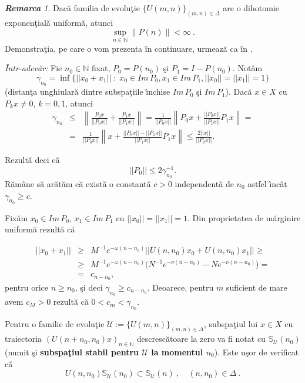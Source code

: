 \documentclass[ a4paper, 12pt]{report}
\newcommand{\N}{\mathbb{N}}
\newcommand{\defnemph}[1]{\textbf{#1}}
\theoremstyle{definition}
\theoremstyle{remark}
\newtheorem{remarc}{\bf Remarca}[section]
\numberwithin{equation}{section}
\begin{document}
\begin{remarc}
\label{boundedprojectors}
Dac\u a familia de evolu\c tie $\{U(m,n)\}_{(m,n)\in\Delta}$ are o {dihotomie exponen\c tial\u a uniform\u a}, atunci
$$\sup_{n\in\N}\|P(n)\| <\infty\ .$$
Demonstra\c tia, pe care o vom prezenta \^in continuare, urmeaz\u a ca \^in \cite[Lema~4.2]{MinhRabigerSchnaubelt}.

{\it \^ Intr-adev\u ar:} Fie $n_0 \in \mathbb{N}$ fixat, $P_0 = P(n_0)$ \c si $P_1 = I - P(n_0)$. Not\u am
$$\gamma_{n_0} = \inf \{ ||x_0 + x_1|| \; : \; x_0 \in Im\, P_0, x_1 \in Im\, P_1, ||x_0|| = ||x_1|| = 1\}$$
(distan\c ta unghiular\u a dintre subspa\c tiile \^\i nchise $Im\, P_0$ \c si $Im\, P_1$). Dac\u a $x\in X$ cu $P_k x \not= 0$, $k = 0, 1$, atunci
\begin{eqnarray*}
\gamma_{n_0}&\leq& \left\lVert \frac{P_0x}{||P_0x||} + \frac{P_1x}{||P_1x||} \right\rVert = \frac{1}{||P_0x||}\left\lVert P_0x + \frac{||P_0x||}{||P_1x||} P_1x \right\rVert = \\
&=& \frac{1}{||P_0x||}\left\lVert x + \frac{||P_0x|| - ||P_1x||}{||P_1x||} P_1x \right\rVert \leq \frac{2||x||}{||P_0x||}.
\end{eqnarray*}

Rezult\u a deci c\u a
$$||P_0|| \leq 2\gamma^{- 1}_{n_0}.$$
R\u am\^ ane s\u a ar\u at\u am c\u a exist\u a o constant\u a $c > 0$ independent\u a de $n_0$ astfel \^\i nc\^ at $\gamma_{n_0} \geq c$.

Fix\u am $x_0 \in Im\, P_0$, $x_1\in Im\, P_1$ cu $||x_0|| = ||x_1|| = 1$. Din proprietatea de m\u arginire uniform\u a rezult\u a c\u a

\begin{eqnarray*}
||x_0 + x_1|| &\geq& M^{-1} e^{- \omega (n - n_0)}|| U(n, n_0)x_0 + U(n, n_0)x_1|| \geq \\
&\geq&  M^{-1} e^{- \omega (n - n_0)}\Big(  N^{-1} e^{- \nu (n - n_0)} -  N e^{- \nu (n - n_0)}\Big)= \\
&=&c_{n - n_0},
\end{eqnarray*}
pentru orice $n \geq n_0$, \c si deci $\gamma_{n_0} \geq c_{n - n_0}$. Deoarece, pentru $m$ suficient de mare avem $c_M > 0$ rezult\u a c\u a $0 < c_m < \gamma_{n _0}$.


\end{remarc}

Pentru o familie de evolu\c tie
$\mathcal{U}:=\{U(m,n)\}_{(m,n)\in\Delta}$, subspa\c tiul lui
$x\in X$ cu traiectoria $(U(n+n_0,n_0)x)_{n\in\N}$
descresc\u atoare la zero va fi notat cu
$\mathbb{S}_{\mathcal{U}}(n_0)$ (numit \c si
\defnemph{subspa\c tiul stabil pentru $\mathcal{U}$ la momentul $n_0$}).
Este u\c sor de verificat c\u a
\begin{equation}
U(n,n_0)\mathbb{S}_{\mathcal{U}}(n_0)\subset \mathbb{S}_{\mathcal{U}}(n)\ ,\quad (n,n_0)\in\Delta\ .
\end{equation}
\end{document}
